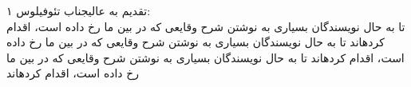 \documentclass{article}
\begin{document}
\lettrine[lines=3]{۱‬‬}{}    تقدیم به عالیجناب تئوفیلوس:\\
تا به حال نویسندگان بسیاری به نوشتن شرح وقایعی كه در بین ما رخ داده است، اقدام کردهاند
تا به حال نویسندگان بسیاری به نوشتن شرح وقایعی كه در بین ما رخ داده است، اقدام کردهاند
تا به حال نویسندگان بسیاری به نوشتن شرح وقایعی كه در بین ما رخ داده است، اقدام کردهاند
\end{document}
